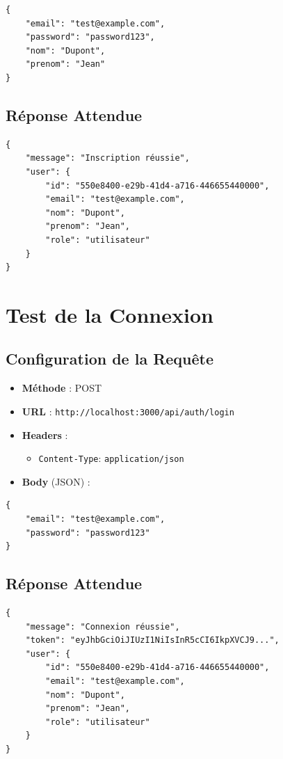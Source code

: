 \begin{lstlisting}[style=javascript]
{
    "email": "test@example.com",
    "password": "password123",
    "nom": "Dupont",
    "prenom": "Jean"
}
\end{lstlisting}

\subsection{Réponse Attendue}

\begin{lstlisting}[style=javascript]
{
    "message": "Inscription réussie",
    "user": {
        "id": "550e8400-e29b-41d4-a716-446655440000",
        "email": "test@example.com",
        "nom": "Dupont",
        "prenom": "Jean",
        "role": "utilisateur"
    }
}
\end{lstlisting}

\section{Test de la Connexion}

\subsection{Configuration de la Requête}

\begin{itemize}
    \item \textbf{Méthode} : POST
    \item \textbf{URL} : \texttt{http://localhost:3000/api/auth/login}
    \item \textbf{Headers} :
        \begin{itemize}
            \item \texttt{Content-Type}: \texttt{application/json}
        \end{itemize}
    \item \textbf{Body} (JSON) :
\end{itemize}

\begin{lstlisting}[style=javascript]
{
    "email": "test@example.com",
    "password": "password123"
}
\end{lstlisting}

\subsection{Réponse Attendue}

\begin{lstlisting}[style=javascript]
{
    "message": "Connexion réussie",
    "token": "eyJhbGciOiJIUzI1NiIsInR5cCI6IkpXVCJ9...",
    "user": {
        "id": "550e8400-e29b-41d4-a716-446655440000",
        "email": "test@example.com",
        "nom": "Dupont",
        "prenom": "Jean",
        "role": "utilisateur"
    }
}
\end{lstlisting}

